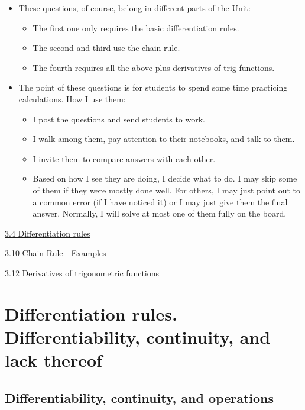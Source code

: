 \documentclass[11pt]{article}
\newcommand{\nl}{\hfill \vspace{-1.1\baselineskip}} %
\newcommand{\viv}{\hspace{8mm} \href{https://www.youtube.com/watch?v=k_VxtK1U9jk&list=PLlwePzQY_wW8qiZD6XYqCnibdY37ygbx7&index=4}{3.4 Differentiation rules}}
\newcommand{\vx}{\hspace{8mm} \href{https://www.youtube.com/watch?v=Qht28m7b13U&list=PLlwePzQY_wW8qiZD6XYqCnibdY37ygbx7&index=10}{3.10 Chain Rule - Examples}}
\newcommand{\vxii}{\hspace{8mm} \href{https://www.youtube.com/watch?v=E_Cvb53vXI0&list=PLlwePzQY_wW8qiZD6XYqCnibdY37ygbx7&index=12}{3.12 Derivatives of trigonometric functions}}
\begin{document}
\begin{comments}
\nl
	\begin{itemize}
		\item These questions, of course, belong in different parts of the Unit:
			\begin{itemize}
				\item The first one only requires the basic differentiation rules.  
				\item The second and third use the chain rule.  
				\item The fourth requires all the above plus derivatives of trig functions.
			\end{itemize}
		\item  The point of these questions is for students to spend some time practicing calculations.  How I use them:
			\begin{itemize}
				\item  I post the questions and send students to work.
				\item I walk among them, pay attention to their notebooks, and talk to them.
				\item I invite them to compare answers with each other.
				\item Based on how I see they are doing, I decide what to do.  I may skip some of them if they were mostly done well.  For others, I may just point out to a common error (if I have noticed it) or I may just give them the final answer.  Normally, I will solve at most one of them fully on the board.
			\end{itemize}
	\end{itemize}	
\end{comments}
\newpage

\begin{videos}
\viv

\vx

\vxii
\end{videos}

\newpage

\section{Differentiation rules.  Differentiability, continuity, and lack thereof}

\subsection{Differentiability, continuity, and operations} 
\end{document}
